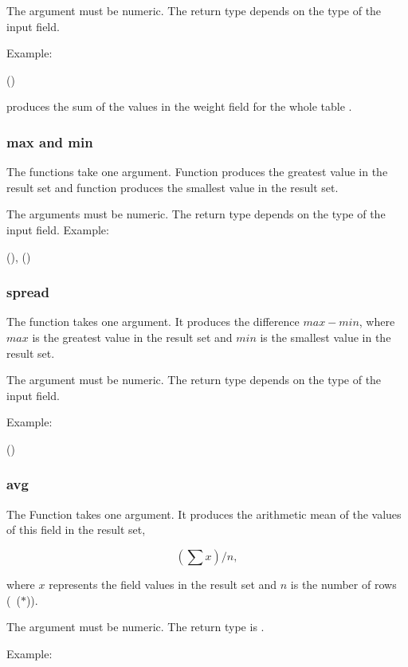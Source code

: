 The argument must be numeric.
The return type depends on the type of the input field.

Example:

 ()
   

produces the sum of the values in the weight field
for the whole table .

\subsubsection{max and min}
The functions take one argument.
Function  produces the greatest value in the result set
and function  produces the smallest value in the result set.

The arguments must be numeric.
The return type depends on the type of the input field.
Example:

 (),
                 ()
 

\subsubsection{spread}
The function takes one argument.
It produces the difference $max - min$,
where $max$ is the greatest value in the result set
and $min$ is the smallest value in the result set.

The argument must be numeric.
The return type depends on the type of the input field.

Example:

 ()
 

\subsubsection{avg}
The Function takes one argument.
It produces the arithmetic mean of the values
of this field in the result set, \ie

\[
\left(\sum{x}\right)/n,
\]

where $x$ represents the
field values in the result set and $n$
is the number of rows (\ie\ ($\ast$)).

The argument must be numeric.
The return type is .

Example:

